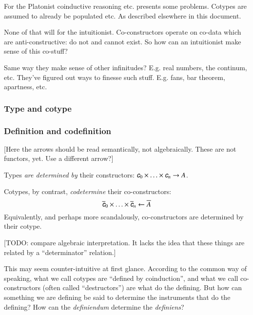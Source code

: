 For the Platonist coinductive reasoning etc. presents some problems.
Cotypes are assumed to already be populated etc.  As described elsewhere in this document.

None of that will for the intuitionist. Co-constructors operate on
co-data which are anti-constructive: do not and cannot exist. So how
can an intuitionist make sense of this co-stuff?

Same way they make sense of other infinitudes? E.g. real numbers, the
continum, etc. They've figured out ways to finesse such stuff. E.g.
fans, bar theorem, apartness, etc.

\subsubsection{Type and cotype}

\subsubsection{Definition and codefinition}



[Here the arrows should be read semantically, not algebraically. These
  are not functors, yet. Use a different arrow?]

Types \textit{are determined by} their constructors: \(\ctor{0}\times\ldots\times\ctor{n} \rightarrow A\).

Cotypes, by contrast, \textit{codetermine} their co-constructors:
\[\coctor{0}\times\ldots\times\coctor{n} \leftarrow \cotype{A}\]
Equivalently, and perhaps more scandalously, co-constructors are
determined by their cotype.

[TODO: compare algebraic interpretation. It lacks the idea that these
  things are related by a ``determinator'' relation.]

This may seem counter-intuitive at first glance. According to the
common way of speaking, what we call cotypes are ``defined by
coinduction'', and what we call co-constructors (often called
``destructors'') are what do the defining. But how can something we
are defining be said to determine the instruments that do the
defining? How can the \textit{definiendum} determine the
\textit{definiens}?

